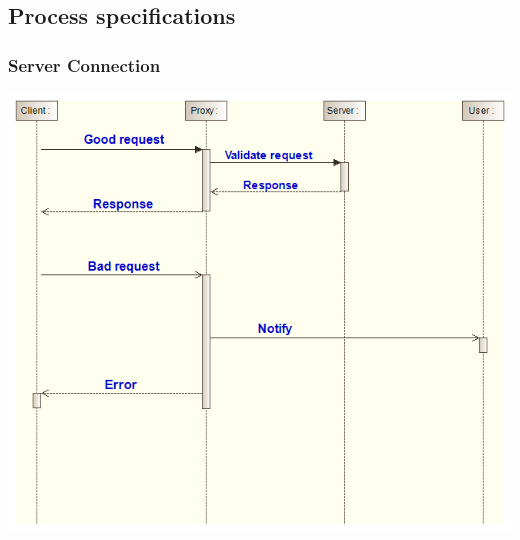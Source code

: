 \documentclass[11pt]{article}
\begin{document}
\newpage

\subsection{Process specifications}

\subsubsection{Server Connection}
\begin{center} 
	\includegraphics[width=\textwidth]{../Images/Server_Connection_Sequence_Diagram.png}\\[0.5cm]
\end{center}

\newpage
\end{document}
